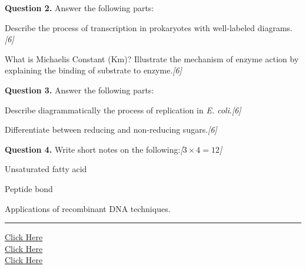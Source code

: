 \documentclass[11pt,a4paper]{article}
\newcommand{\pts}[1]{\hfill   \textit{[#1]}}
\begin{document}
\medskip


\noindent   \textbf{Question 2.} Answer the following parts:

\begin{parts}
  \item Describe the process of transcription in prokaryotes with well-labeled diagrams.\pts{6}
  \item What is Michaelis Constant (Km)? Illustrate the mechanism of enzyme action by explaining the binding of substrate to enzyme.\pts{6}
\end{parts}

\medskip


\noindent   \textbf{Question 3.} Answer the following parts:

\begin{parts}
  \item Describe diagrammatically the process of replication in   \textit{E. coli}.\pts{6}
  \item Differentiate between reducing and non-reducing sugars.\pts{6}
\end{parts}

\medskip


\noindent   \textbf{Question 4.} Write short notes on the following:\pts{$3  \times 4 = 12$}

\begin{parts}
  \item Unsaturated fatty acid
  \item Peptide bond
  \item Applications of recombinant DNA techniques.
\end{parts}

\vfill
\rule{\linewidth}{0.4pt}

\begin{center}\small
\href{https://bhu-exam.vercel.app/}{Click Here}\\[4pt]\href{https://me-aryan.vercel.app/}{Click Here}\\[4pt]\href{https://quashan-me.vercel.app/}{Click Here}
\end{center}
\end{document}
